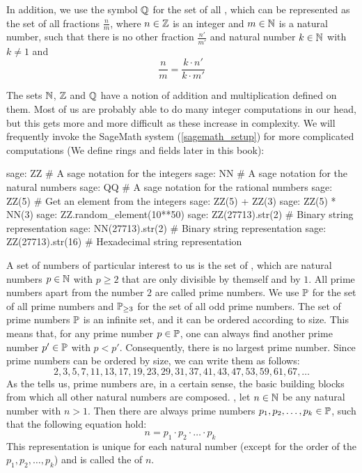 In addition, we use the symbol $\mathbb{Q}$ for the set of all , which can be represented as the set of all fractions $\frac{n}{m}$, where $n\in \mathbb{Z}$ is an integer and $m\in \mathbb{N}$ is a natural number, such that there is no other fraction $\frac{n'}{m'}$ and natural number $k\in \mathbb{N}$ with $k\neq 1$ and
\begin{equation}
\frac{n}{m} = \frac{k\cdot n'}{k\cdot m'}
\end{equation}

The sets $\mathbb{N}$, $\mathbb{Z}$ and $\mathbb{Q}$ have a notion of addition and multiplication defined on them. Most of us are probably able to do many integer computations in our head, but this gets more and more difficult as these increase in complexity.  We will frequently invoke the SageMath system (\ref{sagemath_setup}) for more complicated computations (We define rings and fields later in this book):
\begin{sagecommandline}
sage: ZZ # A sage notation for the integers
sage: NN # A sage notation for the natural numbers
sage: QQ # A sage notation for the rational numbers
sage: ZZ(5) # Get an element from the integers
sage: ZZ(5) + ZZ(3)
sage: ZZ(5) * NN(3)
sage: ZZ.random_element(10**50)
sage: ZZ(27713).str(2) # Binary string representation
sage: NN(27713).str(2) # Binary string representation
sage: ZZ(27713).str(16) # Hexadecimal string representation
\end{sagecommandline}
A set of numbers of particular interest to us is the set of , which are natural numbers $ p \in \mathbb{N} $ with $ p \geq 2 $ that are only divisible by themself and by $1$. All prime numbers apart from the number $ 2 $ are called  prime numbers. We use $ \mathbb{P} $ for the set of all prime numbers and $ \mathbb{P} _{\geq 3} $ for the set of all odd prime numbers. The set of prime numbers $\mathbb{P}$ is an infinite set, and it can be ordered according to size. This means that, for any prime number $p\in\mathbb{P}$, one can always find another prime number $p'\in\mathbb{P}$ with $p<p'$. Consequently, there is no largest prime number. Since prime numbers can be ordered by size, we can write them as follows:
\begin{equation}
\label{eq: primenumber_sequence}
2, 3, 5, 7, 11, 13, 17, 19, 23, 29, 31, 37, 41, 43, 47, 53, 59, 61, 67, \ldots
\end{equation}
As the  tells us, prime numbers are, in a certain sense, the basic building blocks from which all other natural numbers are composed. , let $ n \in \mathbb{N} $ be any natural number with $n>1$. Then there are always prime numbers $ p_1, p_2, \ldots, p_k \in \mathbb{P} $, such that the following equation hold:
\begin{equation}
\label{def:fundamental_theorem_arithmetic}
n = p_1 \cdot p_2 \cdot \ldots \cdot p_k \;
\end{equation}
This representation is unique for each natural number (except for the order of the  $ p_1, p_2, \ldots, p_k$) and is called the  of $n$.

